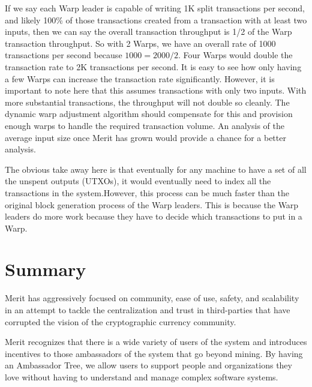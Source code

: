 \documentclass{article}
\begin{document}
If we say each Warp leader is capable of writing 1K split transactions per second, and
likely 100\% of those transactions created from a transaction with at least two inputs,
then we can say the overall transaction throughput is 1/2 of the Warp transaction
throughput. So with 2 Warps, we have an overall rate of 1000 transactions per second
because $1000 = 2000/2$. Four Warps would double the transaction rate to 2K transactions
per second. It is easy to see how only having a few Warps can increase the transaction
rate significantly. However, it is important to note here that this assumes transactions
with only two inputs. With more substantial transactions, the throughput will not
double so cleanly. The dynamic warp adjustment algorithm should compensate for
this and provision enough warps to handle the required transaction volume. An
analysis of the average input size once Merit has grown would provide a chance
for a better analysis.

The obvious take away here is that eventually for any machine to have a set of
all the unspent outputs (UTXOs), it would eventually need to index all the
transactions in the system.However, this process can be much faster than the
original block generation process of the Warp leaders. This is because the Warp
leaders do more work because they have to decide which transactions to put in a Warp.

\section{Summary}

Merit has aggressively focused on community, ease of use, safety, and scalability in an
attempt to tackle the centralization and trust in third-parties that have corrupted
the vision of the cryptographic currency community.

Merit recognizes that there is a wide variety of users of the system and introduces
incentives to those ambassadors of the system that go beyond mining. By having
an Ambassador Tree, we allow users to support people and organizations they love
without having to understand and manage complex software systems.

\clearpage
\printglossaries
\end{document}
